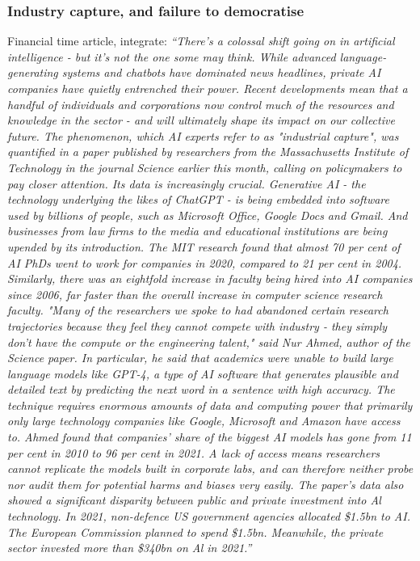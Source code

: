 \subsubsection{Industry capture, and failure to democratise}
Financial time article, integrate:
\textit{``There's a colossal shift going on in artificial intelligence - but it's not the one some may think. While advanced language-generating systems and chatbots have dominated news headlines, private AI companies have quietly entrenched their power. Recent developments mean that a handful of individuals and corporations now control much of the resources and knowledge in the sector - and will ultimately shape its impact on our collective future. The phenomenon, which AI experts refer to as "industrial capture", was quantified in a paper published by researchers from the Massachusetts Institute of Technology in the journal Science earlier this month, calling on policymakers to pay closer attention. Its data is increasingly crucial. Generative AI - the technology underlying the likes of ChatGPT - is being embedded into software used by billions of people, such as Microsoft Office, Google Docs and Gmail. And businesses from law firms to the media and educational institutions are being upended by its introduction.
The MIT research found that almost 70 per cent of AI PhDs went to work for companies in 2020, compared to 21 per cent in 2004. Similarly, there was an eightfold increase in faculty being hired into AI companies since 2006, far faster than the overall increase in computer science research faculty. "Many of the researchers we spoke to had abandoned certain research trajectories because they feel they cannot compete with industry - they simply don't have the compute or the engineering talent," said Nur Ahmed, author of the Science paper. In particular, he said that academics were unable to build large language models like GPT-4, a type of AI software that generates plausible and detailed text by predicting the next word in a sentence with high accuracy. The technique requires enormous amounts of data and computing power that primarily only large technology companies like Google, Microsoft and Amazon have access to. Ahmed found that companies' share of the biggest AI models has gone from 11 per cent in 2010 to 96 per cent in 2021. A lack of access means researchers cannot replicate the models built in corporate labs, and can therefore neither probe nor audit them for potential harms and biases very easily. The paper's data also showed a significant disparity between public and private investment into Al technology. In 2021, non-defence US government agencies allocated \$1.5bn to AI. The European Commission planned to spend \$1.5bn. Meanwhile, the private sector invested more than \$340bn on Al in 2021.''}
